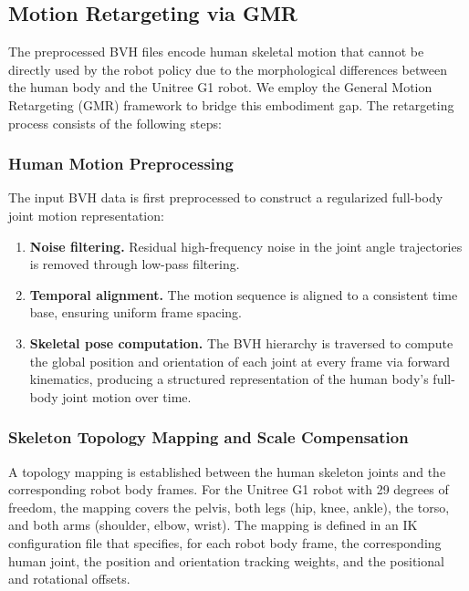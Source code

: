 \subsection{Motion Retargeting via GMR}
\label{sec:motion_retargeting}

The preprocessed BVH files encode human skeletal motion that cannot be directly used by the robot policy due to the morphological differences between the human body and the Unitree G1 robot. We employ the General Motion Retargeting (GMR) framework to bridge this embodiment gap. The retargeting process consists of the following steps:

\subsubsection{Human Motion Preprocessing}

The input BVH data is first preprocessed to construct a regularized full-body joint motion representation:
\begin{enumerate}
    \item \textbf{Noise filtering.} Residual high-frequency noise in the joint angle trajectories is removed through low-pass filtering.
    \item \textbf{Temporal alignment.} The motion sequence is aligned to a consistent time base, ensuring uniform frame spacing.
    \item \textbf{Skeletal pose computation.} The BVH hierarchy is traversed to compute the global position and orientation of each joint at every frame via forward kinematics, producing a structured representation of the human body's full-body joint motion over time.
\end{enumerate}

\subsubsection{Skeleton Topology Mapping and Scale Compensation}

A topology mapping is established between the human skeleton joints and the corresponding robot body frames. For the Unitree G1 robot with 29 degrees of freedom, the mapping covers the pelvis, both legs (hip, knee, ankle), the torso, and both arms (shoulder, elbow, wrist). The mapping is defined in an IK configuration file that specifies, for each robot body frame, the corresponding human joint, the position and orientation tracking weights, and the positional and rotational offsets.

